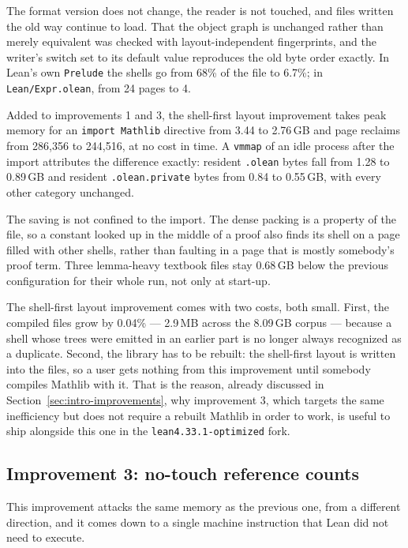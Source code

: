\documentclass{article}
\newcommand{\Lean}{Lean\xspace}      %
\newcommand{\mathlib}{Mathlib\xspace}
\newcommand{\altlean}{\texttt{lean4.33.1-\allowbreak optimized}\xspace}
\begin{document}
The format version does not change, the reader is not touched, and files written the old way continue to load. That the object graph is unchanged rather than merely equivalent was checked with layout-independent fingerprints, and the writer's switch set to its default value reproduces the old byte order exactly. In \Lean's own \texttt{Prelude} the shells go from 68\% of the file to 6.7\%; in \texttt{Lean/Expr.olean}, from 24 pages to 4.

Added to improvements 1 and 3, the shell-first layout improvement takes peak memory for an \texttt{import Mathlib} directive from 3.44 to 2.76\,GB and page reclaims from 286{,}356 to 244{,}516, at no cost in time. A \texttt{vmmap} of an idle process after the import attributes the difference exactly: resident \texttt{.olean} bytes fall from 1.28 to 0.89\,GB and resident \texttt{.olean.private} bytes from 0.84 to 0.55\,GB, with every other category unchanged.

The saving is not confined to the import. The dense packing is a property of the file, so a constant looked up in the middle of a proof also finds its shell on a page filled with other shells, rather than faulting in a page that is mostly somebody's proof term. Three lemma-heavy textbook files stay 0.68\,GB below the previous configuration for their whole run, not only at start-up.

The shell-first layout improvement comes with two costs, both small. First, the compiled files grow by 0.04\% --- 2.9\,MB across the 8.09\,GB corpus --- because a shell whose trees were emitted in an earlier part is no longer always recognized as a duplicate. Second, the library has to be rebuilt: the shell-first layout is written into the files, so a user gets nothing from this improvement until somebody compiles \mathlib with it. That is the reason, already discussed in Section~\ref{sec:intro-improvements}, why improvement 3, which targets the same inefficiency but does not require a rebuilt \mathlib in order to work, is useful to ship alongside this one in the \altlean fork.

\subsection{Improvement 3: no-touch reference counts}
\label{sec:tn-3}

This improvement attacks the same memory as the previous one, from a different direction, and it comes down to a single machine instruction that \Lean did not need to execute.
\end{document}
